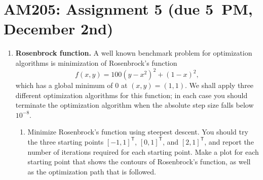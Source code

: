\documentclass[11pt]{article}
\newcommand{\Trans}{\mathsf{T}}
\begin{document}
\section*{AM205: Assignment 5 (due 5~PM, December 2nd)}
\begin{enumerate}
  \item \textbf{Rosenbrock function.} A well known benchmark problem for
    optimization algorithms is minimization of Rosenbrock's function
    \begin{equation}
      f(x,y) = 100(y-x^2)^2 + (1-x)^2,
    \end{equation}
    which has a global minimum of $0$ at $(x,y) = (1,1)$. We shall apply three
    different optimization algorithms for this function; in each case you
    should terminate the optimization algorithm when the absolute step
    size falls below $10^{-8}$.
    \begin{enumerate}
      \item Minimize Rosenbrock's function using steepest descent. You should
	try the three starting points $[-1,1]^\Trans$, $[0,1]^\Trans$, and
	$[2,1]^\Trans$, and report the number of iterations required for each
	starting point. Make a plot for each starting point that shows the
	contours of Rosenbrock's function, as well as the optimization path
	that is followed.
	

\end{enumerate}
\end{enumerate}
\end{document}
